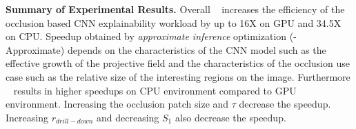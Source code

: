 \vspace{2mm}
\noindent \textbf{Summary of Experimental Results.}
Overall \system~ increases the efficiency of the occlusion based CNN explainability workload by up to 16X on GPU and 34.5X on CPU.
Speedup obtained by \textit{approximate inference} optimization (\system-Approximate) depends on the characteristics of the CNN model such as the effective growth of the projective field and the characteristics of the occlusion use case such as the relative size of the interesting regions on the image.
Furthermore \system~ results in higher speedups on CPU environment compared to GPU environment.
Increasing the occlusion patch size and $\tau$ decrease the speedup.
Increasing $r_{drill-down}$ and decreasing $S_1$ also decrease the speedup.

